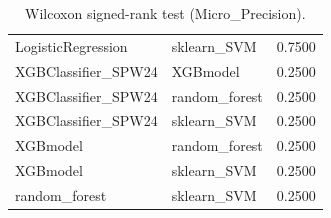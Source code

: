 \begin{table}[t]
\begin{tabular}{llr}
LogisticRegression & sklearn_SVM & 0.7500 \\
XGBClassifier_SPW24 & XGBmodel & 0.2500 \\
XGBClassifier_SPW24 & random_forest & 0.2500 \\
XGBClassifier_SPW24 & sklearn_SVM & 0.2500 \\
XGBmodel & random_forest & 0.2500 \\
XGBmodel & sklearn_SVM & 0.2500 \\
random_forest & sklearn_SVM & 0.2500 \\
\bottomrule
\end{tabular}
\caption{Wilcoxon signed-rank test (Micro_Precision).}
\label{tab:wilcoxon_Micro_Precision}
\end{table}